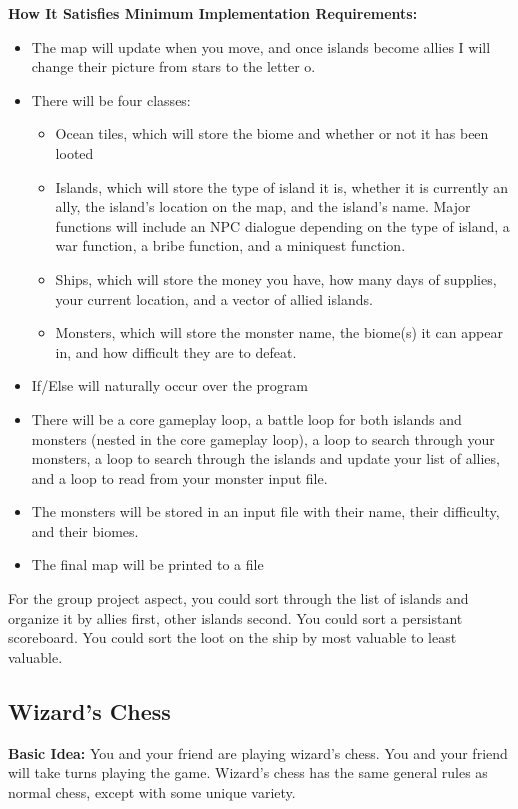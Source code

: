 \textbf{How It Satisfies Minimum Implementation Requirements:}
\begin{itemize}
    \item The map will update when you move, and once islands become allies I will change their picture from stars to the letter o.
    \item There will be four classes:
    \begin{itemize}
        \item Ocean tiles, which will store the biome and whether or not it has been looted
        \item Islands, which will store the type of island it is, whether it is currently an ally, the island's location on the map, and the island's name. Major functions will include an NPC dialogue depending on the type of island, a war function, a bribe function, and a miniquest function.
        \item Ships, which will store the money you have, how many days of supplies, your current location, and a vector of allied islands.
        \item Monsters, which will store the monster name, the biome(s) it can appear in, and how difficult they are to defeat.
    \end{itemize}
    \item If/Else will naturally occur over the program
    \item There will be a core gameplay loop, a battle loop for both islands and monsters (nested in the core gameplay loop),  a loop to search through your monsters, a loop to search through the islands and update your list of allies, and a loop to read from your monster input file.
    \item The monsters will be stored in an input file with their name, their difficulty, and their biomes.
    \item The final map will be printed to a file
\end{itemize}

For the group project aspect, you could sort through the list of islands and organize it by allies first, other islands second. You could sort a persistant scoreboard. You could sort the loot on the ship by most valuable to least valuable.

\subsection{Wizard's Chess}
\textbf{Basic Idea:} You and your friend are playing wizard's chess. You and your friend will take turns playing the game. Wizard's chess has the same general rules as normal chess, except with some unique variety. 

